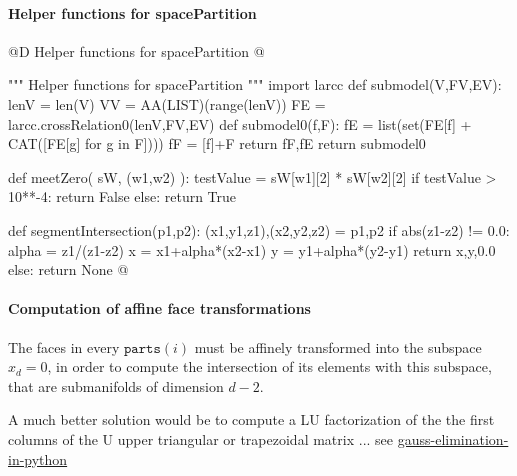 \documentclass[11pt,oneside]{article}    %
\begin{document}
\paragraph{Helper functions for spacePartition}

@D Helper functions for spacePartition
@{""" Helper functions for spacePartition """
import larcc
def submodel(V,FV,EV):
    lenV = len(V)
    VV = AA(LIST)(range(lenV))
    FE = larcc.crossRelation0(lenV,FV,EV)
    def submodel0(f,F):
        fE = list(set(FE[f] + CAT([FE[g] for g in F])))
        fF = [f]+F
        return fF,fE
    return submodel0

def meetZero( sW, (w1,w2) ):
    testValue = sW[w1][2] * sW[w2][2]
    if testValue > 10**-4: 
        return False
    else: return True

def segmentIntersection(p1,p2):
    (x1,y1,z1),(x2,y2,z2) = p1,p2
    if abs(z1-z2) != 0.0:
        alpha = z1/(z1-z2)
        x = x1+alpha*(x2-x1)
        y = y1+alpha*(y2-y1)
        return x,y,0.0
    else: return None
@}



\paragraph{Computation of affine face transformations}
The faces in every $\texttt{parts}(i)$ must be affinely transformed into the subspace $x_d=0$, in order to compute the intersection of its elements with this subspace, that are submanifolds of dimension $d-2$. 

A much better solution would be to compute a LU factorization of the the first columns of the U upper triangular or trapezoidal matrix ... see \href{http://stackoverflow.com/questions/15638650/is-there-a-standard-solution-for-gauss-elimination-in-python}{gauss-elimination-in-python}
\end{document}
